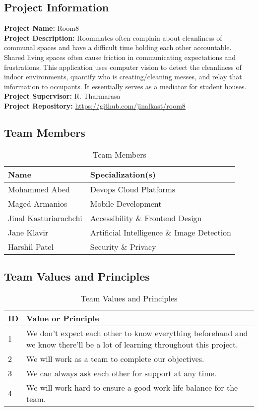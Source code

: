 \documentclass{article}
\begin{document}
\subsection*{Project Information}

\textbf{Project Name:} Room8 \\
\textbf{Project Description:} Roommates often complain about cleanliness of communal spaces and have a difficult time holding each other accountable. Shared living spaces often cause friction in communicating expectations and frustrations. This application uses computer vision to detect the cleanliness of indoor environments, quantify who is creating/cleaning messes, and relay that information to occupants. It essentially serves as a mediator for student houses. \\
\textbf{Project Supervisor:} R. Tharmarasa \\
\textbf{Project Repository:} \href{https://github.com/jinalkast/room8}{\underline{https://github.com/jinalkast/room8}} 

\subsection*{Team Members}
\begin{table}[H]
\caption{Team Members}
\begin{tabular}{|l|l|}
\hline
\textbf{Name} & \textbf{Specialization(s)} \\ \hline
Mohammed Abed & Devops Cloud Platforms \\ \hline
Maged Armanios & Mobile Development \\ \hline
Jinal Kasturiarachchi & Accessibility \& Frontend Design \\ \hline
Jane Klavir & Artificial Intelligence \& Image Detection \\ \hline
Harshil Patel & Security \& Privacy \\ \hline
\end{tabular}
\label{tab:charter-team-members}
\end{table}

\subsection*{Team Values and Principles}
\begin{table}[H]
\caption{Team Values and Principles}
\begin{tabular}{|l|p{12cm}|}
\hline
\textbf{ID} & \textbf{Value or Principle} \\ \hline
1 & We don’t expect each other to know everything beforehand and we know there'll be a lot of learning throughout this project. \\ \hline
2 & We will work as a team to complete our objectives. \\ \hline
3 & We can always ask each other for support at any time. \\ \hline
4 & We will work hard to ensure a good work-life balance for the team. \\ \hline
\end{tabular}
\label{tab:team-values}
\end{table}
\end{document}
